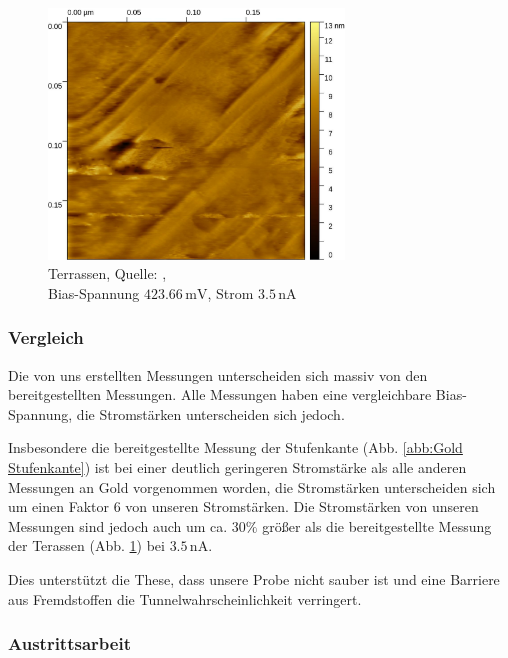 \documentclass[12pt,a4paper]{scrartcl}
\numberwithin{equation}{section} %
\begin{document}
\begin{figure}[ht]
	\centering
	\includegraphics[width=0.7\textwidth]{../media/B2.5/Gold.pdf}
	\caption{Terrassen, Quelle: \cite{Grover}, \\
			Bias-Spannung $423.66 \mathrm{\,mV}$, Strom $3.5 \mathrm{\,nA}$}
	\label{abb:Gold terassen}
\end{figure}

\newpage
\hypertarget{vergleich}{%
\subsubsection{Vergleich}\label{vergleich}}

Die von uns erstellten Messungen unterscheiden sich massiv von den bereitgestellten Messungen. Alle Messungen haben eine vergleichbare Bias-Spannung, die Stromstärken unterscheiden sich jedoch.

Insbesondere die bereitgestellte Messung der Stufenkante (Abb. \ref{abb:Gold Stufenkante}) ist bei einer deutlich geringeren Stromstärke als alle anderen Messungen an Gold vorgenommen worden, die Stromstärken unterscheiden sich um einen Faktor $6$ von unseren Stromstärken. Die Stromstärken von unseren Messungen sind jedoch auch um ca. $30\%$ größer als die bereitgestellte Messung der Terassen (Abb. \ref{abb:Gold terassen}) bei $3.5 \mathrm{\,nA}$.

Dies unterstützt die These, dass unsere Probe nicht sauber ist und eine Barriere aus Fremdstoffen die Tunnelwahrscheinlichkeit verringert.

\hypertarget{austrittsarbeit-1}{%
\subsubsection{Austrittsarbeit}\label{austrittsarbeit-1}}
\end{document}
